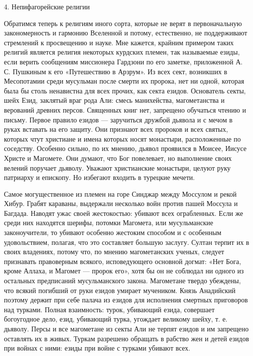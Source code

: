 4. Непифагорейские религии

Обратимся  теперь  к   религиям  иного  сорта,  которые   не  верят  в
первоначальную   закономерность  и   гармонию   Вселенной  и   потому,
естественно,  не поддерживают  стремлений к  просвещению и  науке. Мне
кажется,  крайним примером  таких религий  является религия  некоторых
курдских  племен,   так  называемые  езиды,  если   верить  сообщениям
миссионера Гардзони по  его заметке, приложенной А. С.  Пушкиным к его
«Путешествию в  Арзрум». Из всех  сект, возникших в  Месопотамии среди
мусульман после смерти их пророка, нет ни одной, которая была бы столь
ненавистна для всех  прочих, как секта езидов.  Основатель секты, шейх
Езид,  заклятый  враг рода  Али:  смесь  манихейства, магометанства  и
верований  древних персов.  Священных  книг  нет, запрещено  обучаться
чтению и письму. Первое правило  езидов --- заручиться дружбой дьявола
и с мечом в руках вставать на его защиту. Они признают всех пророков и
всех святых, которых  чтут христиане и имена  которых носят монастыри,
расположенные  по соседству.  Особенно  сильно, по  их мнению,  дьявол
проявился  в Моисее,  Иисусе Христе  и Магомете.  Они думают,  что Бог
повелевает,  но выполнение  своих  велений  поручает дьяволу.  Уважают
христианские монастыри, целуют руку  патриарху и епископу. Но избегают
входить в турецкие мечети.

Самое  могущественное  из племен  на  горе  Синджар между  Моссулом  и
рекой Хибур.  Грабят караваны,  выдержали несколько войн  против пашей
Моссула  и  Багдада.  Наводят  ужас своей  жестокостью:  убивают  всех
ограбленных. Если же среди них находятся шерифы, потомки Магомета, или
мусульманские  законоучители, то  убивают  особенно жестоким  способом
и  с  особенным удовольствием,  полагая,  что  это составляет  большую
заслугу.  Султан  терпит   их  в  своих  владениях,   потому  что,  по
мнению магометанских  ученых, следует признавать  правоверным всякого,
исповедующего основной догмат: «Нет Бога,  кроме Аллаха, и Магомет ---
пророк его», хотя бы он не соблюдал ни одного из остальных предписаний
мусульманского закона. Магометане твердо убеждены, что всякий погибший
от руки езидов умирает мучеником.  Князь Анадийский поэтому держит при
себе палача из езидов для  исполнения смертных приговоров над турками.
Полная взаимность: турок, убивающий езида, совершает богоугодное дело,
езид, убивающий турка, угождает великому шейху, т. е. дьяволу. Персы и
все магометане из секты Али не  терпят езидов и им запрещено оставлять
их в живых. Туркам разрешено обращать в рабство жен и детей езидов при
войнах с ними: езиды при войне с турками убивают всех.

